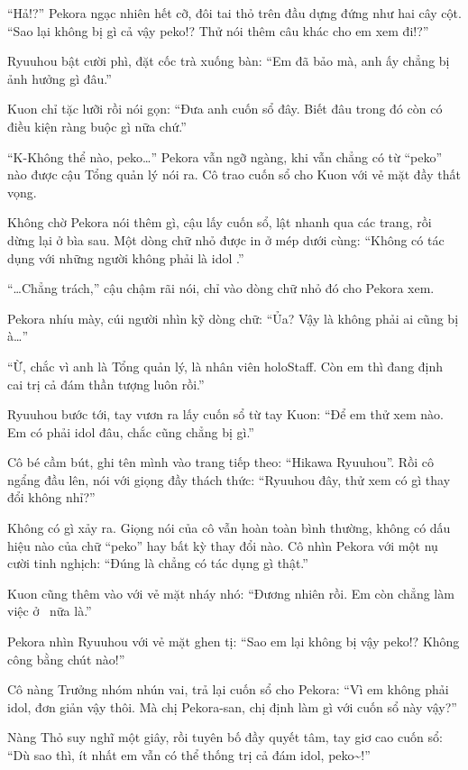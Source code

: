 \documentclass[../main.tex]{subfiles}
\begin{document}
``Hả!?'' Pekora ngạc nhiên hết cỡ, đôi tai thỏ trên đầu dựng đứng như hai cây cột. ``Sao lại không bị gì cả vậy peko!? Thử nói thêm câu khác cho em xem đi!?''

Ryuuhou bật cười phì, đặt cốc trà xuống bàn: ``Em đã bảo mà, anh ấy chẳng bị ảnh hưởng gì đâu.''

Kuon chỉ tặc lưỡi rồi nói gọn: ``Đưa anh cuốn sổ đây. Biết đâu trong đó còn có điều kiện ràng buộc gì nữa chứ.''

``K-Không thể nào, peko\dots'' Pekora vẫn ngỡ ngàng, khi vẫn chẳng có từ ``peko'' nào được cậu Tổng quản lý nói ra. Cô trao cuốn sổ cho Kuon với vẻ mặt đầy thất vọng.

Không chờ Pekora nói thêm gì, cậu lấy cuốn sổ, lật nhanh qua các trang, rồi dừng lại ở bìa sau. Một dòng chữ nhỏ được in ở mép dưới cùng: ``Không có tác dụng với những người không phải là idol \hll.''

``\dots Chẳng trách,'' cậu chậm rãi nói, chỉ vào dòng chữ nhỏ đó cho Pekora xem.

Pekora nhíu mày, cúi người nhìn kỹ dòng chữ: ``Ủa? Vậy là không phải ai cũng bị à\dots''

``Ừ, chắc vì anh là Tổng quản lý, là nhân viên holoStaff. Còn em thì đang định cai trị cả đám thần tượng luôn rồi.''

Ryuuhou bước tới, tay vươn ra lấy cuốn sổ từ tay Kuon: ``Để em thử xem nào. Em có phải idol đâu, chắc cũng chẳng bị gì.''

Cô bé cầm bút, ghi tên mình vào trang tiếp theo: ``Hikawa Ryuuhou''. Rồi cô ngẩng đầu lên, nói với giọng đầy thách thức: ``Ryuuhou đây, thử xem có gì thay đổi không nhỉ?''

Không có gì xảy ra. Giọng nói của cô vẫn hoàn toàn bình thường, không có dấu hiệu nào của chữ ``peko'' hay bất kỳ thay đổi nào. Cô nhìn Pekora với một nụ cười tinh nghịch: ``Đúng là chẳng có tác dụng gì thật.''

Kuon cũng thêm vào với vẻ mặt nháy nhó: ``Đương nhiên rồi. Em còn chẳng làm việc ở \hll\ nữa là.''

Pekora nhìn Ryuuhou với vẻ mặt ghen tị: ``Sao em lại không bị vậy peko!? Không công bằng chút nào!''

Cô nàng Trưởng nhóm nhún vai, trả lại cuốn sổ cho Pekora: ``Vì em không phải idol, đơn giản vậy thôi. Mà chị Pekora-san, chị định làm gì với cuốn sổ này vậy?''

Nàng Thỏ suy nghĩ một giây, rồi tuyên bố đầy quyết tâm, tay giơ cao cuốn sổ: ``Dù sao thì, ít nhất em vẫn có thể thống trị cả đám idol, peko\~{}!''
\end{document}

